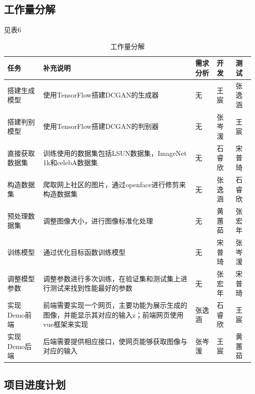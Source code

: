 \documentclass[
  hyperref, a4paper]{ctexart}
\begin{document}
\hypertarget{ux5de5ux4f5cux91cfux5206ux89e3}{%
\subsection{工作量分解}\label{ux5de5ux4f5cux91cfux5206ux89e3}}

见表6

\begin{table}
    \caption{工作量分解}
    \centering
    \begin{tabular}{|p{3.0cm}<{\centering}|p{5.0cm}<{\centering}|p{1.5cm}<{\centering}|p{1.5cm}<{\centering}|p{1.5cm}<{\centering}|}
    \hline
    任务       & 补充说明                                               & 需求分析 & 开发  & 测试  \\ \hline
    搭建生成模型   & 使用TensorFlow搭建DCGAN的生成器                            & 无    & 王宸  & 张逸涵 \\ \hline
    搭建判别模型   & 使用TensorFlow搭建DCGAN的判别器                            & 无    & 张岑湲 & 王宸  \\ \hline
    直接获取数据集  & 训练使用的数据集包括LSUN数据集，ImageNet 1k和celebA数据集            & 无    & 石睿欣 & 宋普琦 \\ \hline
    构造数据集    & 爬取网上社区的图片，通过openface进行修剪来构造数据集                     & 无    & 张逸涵 & 石睿欣 \\ \hline
    预处理数据集   & 调整图像大小，进行图像标准化处理                                   & 无    & 黄蕙茹 & 张宏年 \\ \hline
    训练模型     & 通过优化目标函数训练模型                                       & 无    & 宋普琦 & 张岑湲 \\ \hline
    调整模型参数   & 调整参数进行多次训练，在验证集和测试集上进行测试来找到性能最好的参数                 & 无    & 张宏年 & 宋普琦 \\ \hline
    实现Demo前端 & 前端需要实现一个网页，主要功能为展示生成的图像，并能显示其对应的输入z；前端网页使用vue框架来实现 & 张逸涵  & 石睿欣 & 王宸  \\ \hline
    实现Demo后端 & 后端需要提供相应接口，使网页能够获取图像与对应的输入                         & 张岑湲  & 王宸  & 黄蕙茹 \\ \hline
    \end{tabular}
\end{table}

\hypertarget{ux9879ux76eeux8fdbux5ea6ux8ba1ux5212}{%
\subsection{项目进度计划}\label{ux9879ux76eeux8fdbux5ea6ux8ba1ux5212}}
\end{document}
